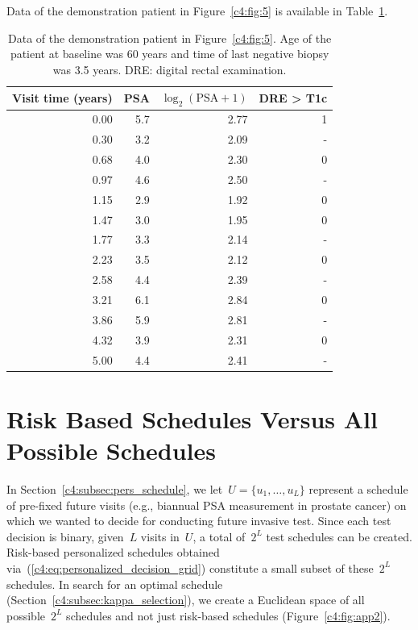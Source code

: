 \begin{subappendices}
Data of the demonstration patient in Figure~\ref{c4:fig:5} is available in Table~\ref{c4:tab:demo_patient}.
\begin{table}
\small
\centering
\caption{Data of the demonstration patient in Figure~\ref{c4:fig:5}. Age of the patient at baseline was 60 years and time of last negative biopsy was 3.5 years. DRE: digital rectal examination.}
\label{c4:tab:demo_patient}
\begin{tabular}{rrrr}
\toprule
Visit time (years) & PSA & $\log_2(\mbox{PSA}+1)$ & DRE > T1c\\ 
\midrule
0.00 & 5.7 & 2.77 &            1\\
0.30 & 3.2 & 2.09 &           -\\
0.68 & 4.0 & 2.30 &            0\\
0.97 & 4.6 & 2.50 &           -\\
1.15 & 2.9 & 1.92 &            0\\
1.47 & 3.0 & 1.95 &            0\\
1.77 & 3.3 & 2.14 &           -\\
2.23 & 3.5 & 2.12 &            0\\
2.58 & 4.4 & 2.39 &           -\\
3.21 & 6.1 & 2.84 &            0\\
3.86 & 5.9 & 2.81 &           -\\
4.32 & 3.9 & 2.31 &            0\\
5.00 & 4.4 & 2.41 &           -\\
\bottomrule
\end{tabular}   
\end{table}

\section{Risk Based Schedules Versus All Possible Schedules}
\label{c4:appendix:all_possible}
In Section~\ref{c4:subsec:pers_schedule}, we let~$U = \{u_1, \ldots, u_L\}$ represent a schedule of pre-fixed future visits (e.g., biannual PSA measurement in prostate cancer) on which we wanted to decide for conducting future invasive test. Since each test decision is binary, given~$L$ visits in~$U$, a total of~$2^L$ test schedules can be created. Risk-based personalized schedules obtained via~(\ref{c4:eq:personalized_decision_grid}) constitute a small subset of these~$2^L$ schedules. In search for an optimal schedule (Section~\ref{c4:subsec:kappa_selection}), we create a Euclidean space of all possible~$2^L$ schedules and not just risk-based schedules (Figure~\ref{c4:fig:app2}). 


\end{subappendices}
